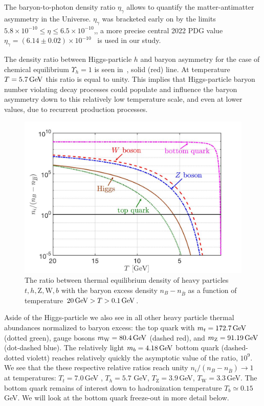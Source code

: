 {\color{black}The baryon-to-photon density ratio $\eta_\gamma$ allows to quantify the matter-antimatter asymmetry in the Universe. $\eta_\gamma$ was bracketed early on  by the limits $5.8\times10^{-10} \leqslant\eta\leqslant6.5\times10^{-10}$,, a more precise central 2022 PDG value $\eta_\gamma=(6.14\pm0.02)\times10^{-10}$~\cite{ParticleDataGroup:2022pth} is used in our study.} 

{\color{black}The density ratio between Higgs-particle $h$ and baryon asymmetry for the case of chemical equilibrium $\Upsilon_h=1$ is seen in~, solid (red) line. At temperature $T=5.7\text{\,GeV}$ this ratio is equal to unity. This implies that Higgs-particle baryon number violating decay processes could populate and influence the baryon asymmetry down to this relatively low temperature scale, and even at lower values, due to recurrent production processes.} 

\begin{figure}
\centerline{\includegraphics[width=0.96\linewidth]{./plots/ni_over_nb_vs_T-new.jpg}}
\caption{{\color{black} The ratio between thermal equilibrium density of heavy particles $t,h, \mathrm{Z,W}, b$ with the baryon excess density $n_B-n_{\bar B}$ as a function of temperature $20\text{\,GeV}>T>0.1\text{\,GeV}$. 
}}
\label{HiggsDensity:fig} 
\end{figure}

{\color{black}Aside of the Higgs-particle we also see in  all other heavy particle thermal abundances normalized to baryon excess: the top quark with $m_t=172.7\text{\,GeV}$ (dotted green), gauge bosons $m_\mathrm{W}=80.4\text{\,GeV}$ (dashed red), and $m_\mathrm{Z}=91.19\text{\,GeV}$ (dot-dashed blue). The relatively light $m_b=4.18\text{\,GeV}$ bottom quark (dashed-dotted violett) reaches relatively quickly the asymptotic value of the ratio, $10^{9}$. We see that the these respective relative ratios reach unity $n_i/(n_B-n_{\bar{B}})\to 1$ at temperatures: $T_t=7.0$\,GeV , $T_h=5.7$ GeV, $T_\mathrm{Z}=3.9$\,GeV, $T_\mathrm{W}=3.3$\,GeV. The bottom quark remains of interest down to hadronization temperature $T_b\simeq 0.15$\,GeV. We will look at the bottom quark freeze-out in more detail below.}

